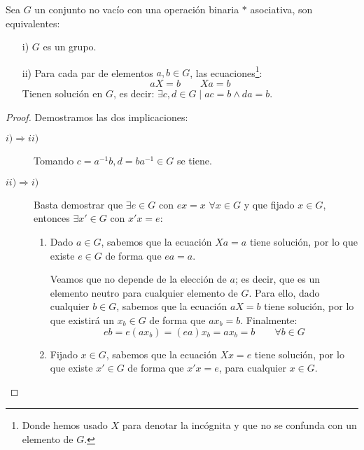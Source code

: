 \begin{prop}
    Sea $G$ un conjunto no vacío con una operación binaria $\ast$ asociativa, son equivalentes:
    \begin{enumerate}
        \item[i)] $G$ es un grupo.
        \item[ii)] Para cada par de elementos $a,b\in G$, las ecuaciones\footnote{Donde hemos usado $X$ para denotar la incógnita y que no se confunda con un elemento de $G$.}:
            \begin{equation*}
                aX = b \qquad Xa = b
            \end{equation*}
            Tienen solución en $G$, es decir: $\exists c,d\in G\mid ac=b \land da = b$.
    \end{enumerate}
    \begin{proof}
        Demostramos las dos implicaciones:
        \begin{description}
            \item [$i)\Rightarrow ii)$] Tomando $c=a^{-1}b,d = ba^{-1}\in G$ se tiene.
            \item [$ii)\Rightarrow i)$] Basta demostrar que $\exists e\in G$ con $ex = x$ $\forall x\in G$ y que fijado $x\in G$, entonces $\exists x'\in G$ con $x'x = e$:

                \begin{enumerate}
                    \item Dado $a\in G$, sabemos que la ecuación $Xa=a$ tiene solución, por lo que existe $e\in G$ de forma que $ea = a$.

                        Veamos que no depende de la elección de $a$; es decir, que es un elemento neutro para cualquier elemento de $G$. Para ello, dado cualquier $b\in G$, sabemos que la ecuación $aX=b$ tiene solución, por lo que existirá un $x_b\in G$ de forma que $ax_b=b$. Finalmente:
                        \begin{equation*}
                            eb = e(ax_b) = (ea)x_b = ax_b = b \qquad \forall b\in G
                        \end{equation*}
                    \item Fijado $x\in G$, sabemos que la ecuación $Xx=e$ tiene solución, por lo que existe $x'\in G$ de forma que $x'x = e$, para cualquier $x\in G$.
                \end{enumerate}
        \end{description}
    \end{proof}
\end{prop}

